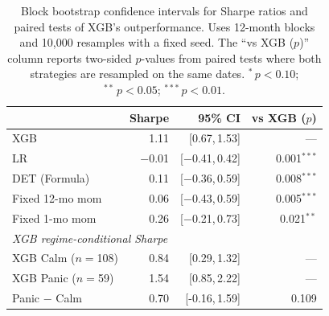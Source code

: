 \begin{table}[H]
\centering
\small
\begin{tabular}{l r r r}
\toprule
 & Sharpe & 95\% CI & vs XGB ($p$) \\
\midrule
XGB & 1.11 & [0.67,\,1.53] & --- \\
LR & $-$0.01 & [$-$0.41,\,0.42] & 0.001$^{***}$ \\
DET (Formula) & 0.11 & [$-$0.36,\,0.59] & 0.008$^{***}$ \\
Fixed 12-mo mom & 0.06 & [$-$0.43,\,0.59] & 0.005$^{***}$ \\
Fixed 1-mo mom & 0.26 & [$-$0.21,\,0.73] & 0.021$^{**}$ \\
\midrule
\multicolumn{4}{l}{\emph{XGB regime-conditional Sharpe}} \\[2pt]
XGB Calm ($n=$108) & 0.84 & [0.29,\,1.32] & --- \\
XGB Panic ($n=$59) & 1.54 & [0.85,\,2.22] & --- \\
Panic $-$ Calm & 0.70 & [-0.16,\,1.59] & 0.109 \\
\bottomrule
\end{tabular}
\caption{Block bootstrap confidence intervals for Sharpe ratios and paired tests of XGB's outperformance. Uses 12-month blocks and 10{,}000 resamples with a fixed seed. The ``vs XGB ($p$)'' column reports two-sided $p$-values from paired tests where both strategies are resampled on the same dates. $^{*}\,p<0.10$; $^{**}\,p<0.05$; $^{***}\,p<0.01$.}
\label{tab:bootstrap}
\end{table}